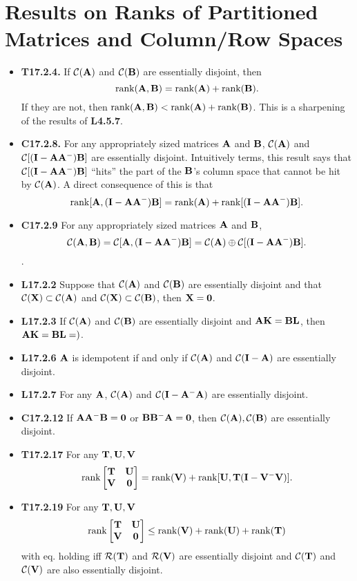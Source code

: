 \documentclass[a4paper, oneside]{book}
\begin{document}
\section{Results on Ranks of Partitioned Matrices and Column/Row Spaces}
\begin{itemize}
\item \textbf{T17.2.4.} If $\mathcal C (\mathbf A)$ and $\mathcal{C}(\mathbf B)$ are essentially disjoint, then $$\text{rank}(\mathbf A, \mathbf B)=\text{rank}(\mathbf A)+ \text{rank}(\mathbf B).$$ If they are not, then $\text{rank}(\mathbf A, \mathbf B)<\text{rank}(\mathbf A)+ \text{rank}(\mathbf B)$. This is a sharpening of the results of \textbf{L4.5.7}.
\item \textbf{C17.2.8.} For any appropriately sized matrices $\mathbf A$ and $\mathbf B$, $\mathcal{C}(\mathbf A)$ and $\mathcal{C}[(\mathbf{I-AA^-})\mathbf B]$ are essentially disjoint. Intuitively terms, this result says that  $\mathcal{C}[(\mathbf{I-AA^-})\mathbf B]$ ``hits'' the part of the  $\mathbf B$'s column space that cannot be hit by $\mathcal{C}(\mathbf A)$. A direct consequence of this is that $$\text{rank}[\mathbf A, (\mathbf{I-AA^-})\mathbf B] = \text{rank}(\mathbf A) + \text{rank}[(\mathbf{I-AA^-})\mathbf B].$$
\item \textbf{C17.2.9} For any appropriately sized matrices $\mathbf A$ and $\mathbf B$, $$\mathcal{C}(\mathbf{A,B})=\mathcal C[\mathbf A, \mathbf{(I-AA^-)B}] = \mathcal{C}(\mathbf A)\oplus\mathcal{C}[\mathbf{(I-AA^-)B}].$$.
\item \textbf{L17.2.2} Suppose that $\mathcal{C}(\mathbf A)$ and $\mathcal{C}(\mathbf B)$ are essentially disjoint and that $\mathcal{C}(\mathbf X) \subset \mathcal{C}(\mathbf A)$ and $\mathcal{C}(\mathbf X) \subset \mathcal{C}(\mathbf B)$, then $\mathbf {X=0}$.
\item \textbf{L17.2.3} If $\mathcal{C}(\mathbf A)$ and $\mathcal{C}(\mathbf B)$ are essentially disjoint and $\mathbf{AK} = \mathbf{BL}$, then $\mathbf{AK=BL=)}$.
\item \textbf{L17.2.6} $\mathbf A$ is idempotent if and only if $\mathcal{C}(\mathbf A)$ and $\mathcal{C}(\mathbf{I-A})$ are essentially disjoint. 
\item \textbf{L17.2.7} For any $\mathbf A$, $\mathcal{C}(\mathbf A)$ and $\mathcal{C}(\mathbf{I-A^-A})$ are essentially disjoint. 
\item \textbf{C17.2.12} If $\mathbf{AA^-B=0}$ or $\mathbf{BB^-A=0}$, then $\mathcal{C}(\mathbf A), \mathcal{C}(\mathbf B)$ are essentially disjoint.
\item \textbf{T17.2.17} For any $\mathbf{T,U,V}$ $$\text{rank}\begin{bmatrix}
\mathbf T & \mathbf U \\ \mathbf V & \mathbf 0
\end{bmatrix} = \text{rank}(\mathbf V) + \text{rank}[\mathbf U, \mathbf{T(I-V^-V)}].$$
\item \textbf{T17.2.19} For any $\mathbf{T,U,V}$ $$\text{rank}\begin{bmatrix}
\mathbf T & \mathbf U \\ \mathbf V & \mathbf 0
\end{bmatrix} \le \text{rank}(\mathbf V) + \text{rank} (\mathbf U) + \text{rank} (\mathbf T)$$ with eq. holding iff $\mathcal{R}(\mathbf{T})$ and $\mathcal{R}(\mathbf{V})$ are essentially disjoint and $\mathcal{C}(\mathbf{T})$ and $\mathcal{C}(\mathbf{V})$ are also essentially disjoint. 
\end{itemize} 
\end{document}

